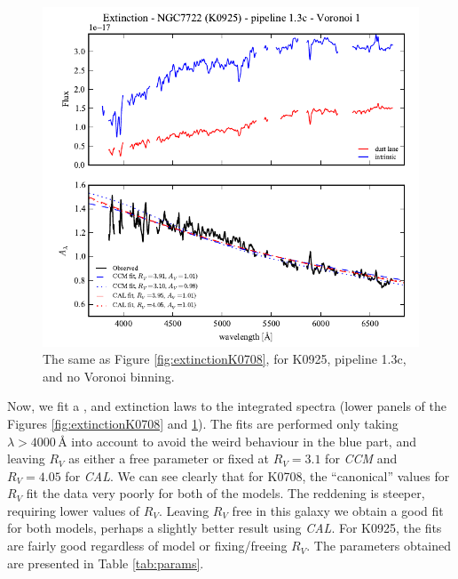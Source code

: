 \documentclass[a4paper]{article}
\newcommand{\angstrom}{\text{\AA}}
\def\CCM{\textit{CCM}\xspace}
\def\CAL{\textit{CAL}\xspace}
\begin{document}
\begin{figure}
\includegraphics{figures/spectra_K0925_1.3c_v01.pdf}
\caption{The same as Figure \ref{fig:extinctionK0708}, for K0925, pipeline 1.3c, and
no Voronoi binning.}
\label{fig:extinctionK0925}
\end{figure}

Now, we fit a \citet*[hereafter \CCM, blue in the $A_\lambda$ plots]{CCM1989},
and \citet[hereafter \CAL, red in the $A_\lambda$ plots]{Calzetti1994}
extinction laws to the integrated spectra (lower panels of the Figures
\ref{fig:extinctionK0708} and \ref{fig:extinctionK0925}). The fits are performed
only taking $\lambda > 4000\,\angstrom$ into account to avoid the weird
behaviour in the blue part, and leaving $R_V$ as either a free parameter or
fixed at $R_V = 3.1$ for \CCM and $R_V = 4.05$ for \CAL. We can see clearly that
for K0708, the ``canonical'' values for $R_V$ fit the data very poorly for both
of the models. The reddening is steeper, requiring lower values of $R_V$.
Leaving $R_V$ free in this galaxy we obtain a good fit for both models, perhaps
a slightly better result using \CAL. For K0925, the fits are fairly good
regardless of model or fixing/freeing $R_V$. The parameters obtained are
presented in Table \ref{tab:params}.
\end{document}
